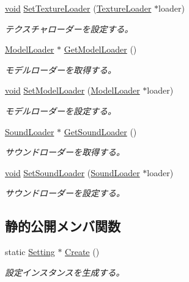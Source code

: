 \begin{DoxyCompactItemize}
\mbox{\hyperlink{namespace_effekseer_ab34c4088e512200cf4c2716f168deb56}{void}} \mbox{\hyperlink{class_effekseer_1_1_setting_a0475d684fcef475fae8250d8b43a5ffc}{Set\+Texture\+Loader}} (\mbox{\hyperlink{class_effekseer_1_1_texture_loader}{Texture\+Loader}} $\ast$loader)
\begin{DoxyCompactList}\small\item\em テクスチャローダーを設定する。 \end{DoxyCompactList}\item 
\mbox{\hyperlink{class_effekseer_1_1_model_loader}{Model\+Loader}} $\ast$ \mbox{\hyperlink{class_effekseer_1_1_setting_a3b5645647e7fba4693f689fdae352573}{Get\+Model\+Loader}} ()
\begin{DoxyCompactList}\small\item\em モデルローダーを取得する。 \end{DoxyCompactList}\item 
\mbox{\hyperlink{namespace_effekseer_ab34c4088e512200cf4c2716f168deb56}{void}} \mbox{\hyperlink{class_effekseer_1_1_setting_a98982ad75809cd84b95865fc58fbd325}{Set\+Model\+Loader}} (\mbox{\hyperlink{class_effekseer_1_1_model_loader}{Model\+Loader}} $\ast$loader)
\begin{DoxyCompactList}\small\item\em モデルローダーを設定する。 \end{DoxyCompactList}\item 
\mbox{\hyperlink{class_effekseer_1_1_sound_loader}{Sound\+Loader}} $\ast$ \mbox{\hyperlink{class_effekseer_1_1_setting_a6d450ef2fbe5c3aaed08ffd3c8d0c868}{Get\+Sound\+Loader}} ()
\begin{DoxyCompactList}\small\item\em サウンドローダーを取得する。 \end{DoxyCompactList}\item 
\mbox{\hyperlink{namespace_effekseer_ab34c4088e512200cf4c2716f168deb56}{void}} \mbox{\hyperlink{class_effekseer_1_1_setting_a7f383e108785141004f9ed4008ae6b20}{Set\+Sound\+Loader}} (\mbox{\hyperlink{class_effekseer_1_1_sound_loader}{Sound\+Loader}} $\ast$loader)
\begin{DoxyCompactList}\small\item\em サウンドローダーを設定する。 \end{DoxyCompactList}\end{DoxyCompactItemize}
\subsection*{静的公開メンバ関数}
\begin{DoxyCompactItemize}
\item 
static \mbox{\hyperlink{class_effekseer_1_1_setting}{Setting}} $\ast$ \mbox{\hyperlink{class_effekseer_1_1_setting_ad31867188a9aab5bcc292e70e4d636de}{Create}} ()
\begin{DoxyCompactList}\small\item\em 設定インスタンスを生成する。 \end{DoxyCompactList}\end{DoxyCompactItemize}
